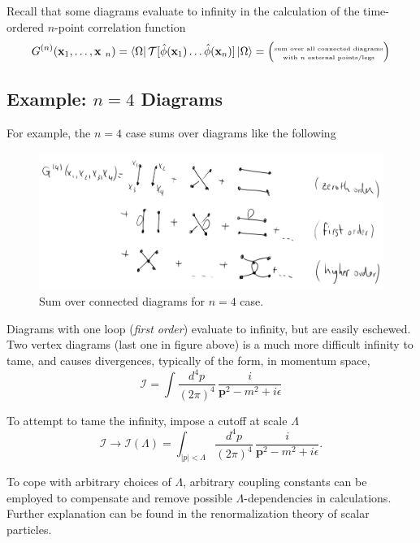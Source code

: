 \noindent Recall that some diagrams evaluate to infinity in the calculation of the time-ordered $n$-point correlation function
\begin{equation}
G^{(n)}(\textbf{x}_1,\dots,\textbf{x
}_n) = \bra{\Omega} \mathcal{T}[\hat{\phi}(\textbf{x}_1) \dots \hat{\phi}(\textbf{x}_n) ] \ket{\Omega} = \left( {\tiny \stackanchor{sum over all connected diagrams}{with $n$ external points/legs} } \right)
\end{equation}

\subsection*{Example: $n=4$ Diagrams}

\noindent For example, the $n=4$ case sums over diagrams like the following

\begin{figure}[H]
	\centering
	\includegraphics[scale=0.4]{images/g4.png}
	\caption{Sum over connected diagrams for $n=4$ case.}
\end{figure}

\noindent Diagrams with one loop (\textit{first order}) evaluate to infinity, but are easily eschewed. Two vertex diagrams (last one in figure above) is a much more difficult infinity to tame, and causes divergences, typically of the form, in momentum space,
\begin{equation}
\mathcal{I} = \int \frac{d^4 p} {(2\pi)^4} \, \frac{i}{\textbf{p}^2-m^2+i\epsilon}
\end{equation}

\noindent To attempt to tame the infinity, impose a cutoff at scale $\Lambda$
\begin{equation}
\mathcal{I} \to \mathcal{I}(\Lambda) = \int_{|p| < \Lambda} \frac{d^4 p} {(2\pi)^4} \, \frac{i}{\textbf{p}^2-m^2+i\epsilon} .
\end{equation}

\noindent To cope with arbitrary choices of $\Lambda$, arbitrary coupling constants can be employed to compensate and remove possible $\Lambda$-dependencies in calculations. Further explanation can be found in the renormalization theory of scalar particles.

